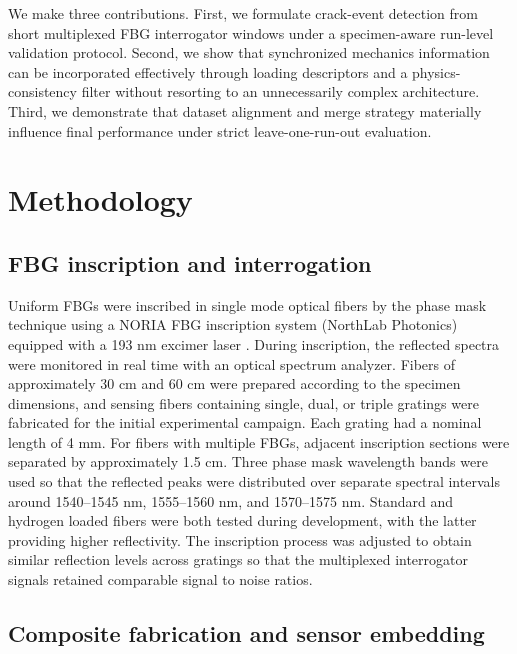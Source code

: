 \documentclass[fleqn,10pt]{wlscirep}
\begin{document}
We make three contributions. First, we formulate crack-event detection from short multiplexed FBG interrogator windows under a specimen-aware run-level validation protocol. Second, we show that synchronized mechanics information can be incorporated effectively through loading descriptors and a physics-consistency filter without resorting to an unnecessarily complex architecture. Third, we demonstrate that dataset alignment and merge strategy materially influence final performance under strict leave-one-run-out evaluation.

\section*{Methodology}

\subsection*{FBG inscription and interrogation}

Uniform FBGs were inscribed in single mode optical fibers by the phase mask technique using a NORIA FBG inscription system (NorthLab Photonics) equipped with a 193 nm excimer laser \cite{nieuwland2016}. During inscription, the reflected spectra were monitored in real time with an optical spectrum analyzer. Fibers of approximately 30 cm and 60 cm were prepared according to the specimen dimensions, and sensing fibers containing single, dual, or triple gratings were fabricated for the initial experimental campaign. Each grating had a nominal length of 4 mm. For fibers with multiple FBGs, adjacent inscription sections were separated by approximately 1.5 cm. Three phase mask wavelength bands were used so that the reflected peaks were distributed over separate spectral intervals around 1540--1545 nm, 1555--1560 nm, and 1570--1575 nm. Standard and hydrogen loaded fibers were both tested during development, with the latter providing higher reflectivity. The inscription process was adjusted to obtain similar reflection levels across gratings so that the multiplexed interrogator signals retained comparable signal to noise ratios.

\subsection*{Composite fabrication and sensor embedding}
\end{document}
